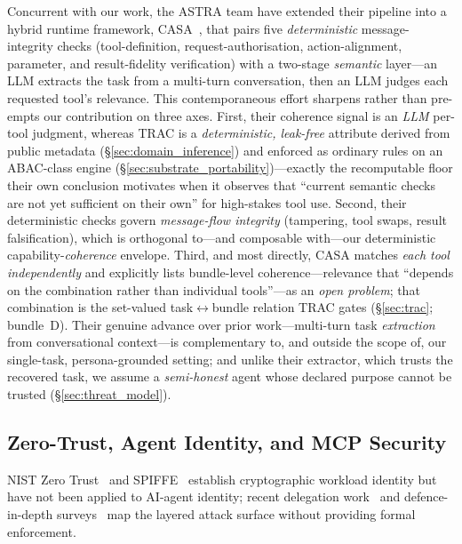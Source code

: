\documentclass[sigconf,review,anonymous]{acmart}
\begin{document}
Concurrent with our work, the ASTRA team have extended their pipeline into a hybrid runtime framework, CASA~\cite{elhelou2026casa}, that pairs five \emph{deterministic} message-integrity checks (tool-definition, request-authorisation, action-alignment, parameter, and result-fidelity verification) with a two-stage \emph{semantic} layer---an LLM extracts the task from a multi-turn conversation, then an LLM judges each requested tool's relevance. This contemporaneous effort sharpens rather than pre-empts our contribution on three axes. First, their coherence signal is an \emph{LLM} per-tool judgment, whereas TRAC is a \emph{deterministic, leak-free} attribute derived from public metadata (\S\ref{sec:domain_inference}) and enforced as ordinary rules on an ABAC-class engine (\S\ref{sec:substrate_portability})---exactly the recomputable floor their own conclusion motivates when it observes that ``current semantic checks are not yet sufficient on their own'' for high-stakes tool use. Second, their deterministic checks govern \emph{message-flow integrity} (tampering, tool swaps, result falsification), which is orthogonal to---and composable with---our deterministic capability-\emph{coherence} envelope. Third, and most directly, CASA matches \emph{each tool independently} and explicitly lists bundle-level coherence---relevance that ``depends on the combination rather than individual tools''---as an \emph{open problem}; that combination is the set-valued task$\leftrightarrow$bundle relation TRAC gates (\S\ref{sec:trac}; bundle~D). Their genuine advance over prior work---multi-turn task \emph{extraction} from conversational context---is complementary to, and outside the scope of, our single-task, persona-grounded setting; and unlike their extractor, which trusts the recovered task, we assume a \emph{semi-honest} agent whose declared purpose cannot be trusted (\S\ref{sec:threat_model}).

\subsection{Zero-Trust, Agent Identity, and MCP Security}
\label{sec:zero_trust}
\label{sec:agent_safety}

NIST Zero Trust~\cite{rose2020zero} and SPIFFE~\cite{spiffe2022} establish cryptographic workload identity but have not been applied to AI-agent identity; recent delegation work~\cite{south2025authenticated,rampalli2026pedigree} and defence-in-depth surveys~\cite{chu2026stateless,jangam2024comprehensive,muhammad2024integrative} map the layered attack surface without providing formal enforcement.
\end{document}
